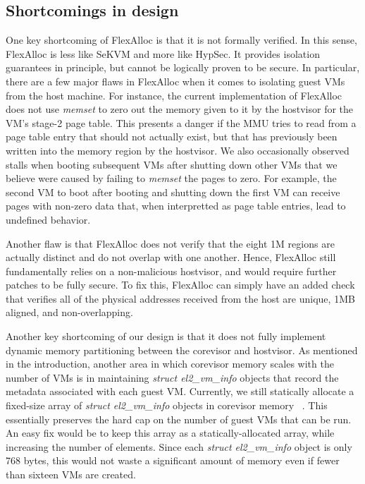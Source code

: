 \subsection{Shortcomings in design}

One key shortcoming of FlexAlloc is that it is not formally verified. In
this sense, FlexAlloc is less like SeKVM and more like HypSec. It provides isolation guarantees
in principle, but cannot be logically proven to be secure. In particular, there
are a few major flaws in FlexAlloc when it comes to isolating guest VMs from
the host machine. For instance, the current implementation of FlexAlloc
does not use \textit{memset} to zero out the memory given to it by the hostvisor
for the VM's stage-2 page table. This presents a danger if the MMU tries to
read from a page table entry that should not actually exist, but that has
previously been written into the memory region by the hostvisor. We also occasionally
observed stalls when booting subsequent VMs after shutting down other VMs that we
believe were caused by failing to \textit{memset} the pages to zero. For example, the second
VM to boot after booting and shutting down the first VM can receive pages with non-zero data
that, when interpretted as page table entries, lead to undefined behavior.

Another flaw is that
FlexAlloc does not verify that the eight 1M regions are actually distinct and
do not overlap with one another. Hence, FlexAlloc still fundamentally relies on
a non-malicious hostvisor, and would require further patches to be fully secure.
To fix this, FlexAlloc can simply have an added check that verifies all of the
physical addresses received from the host are unique, 1MB aligned, and non-overlapping.

Another key shortcoming of our design is that it does not fully implement
dynamic memory partitioning between the corevisor and hostvisor. As mentioned in
the introduction, another area in which corevisor memory scales with the number
of VMs is in maintaining \textit{struct el2\_vm\_info} objects that record the
metadata associated with each guest VM. Currently, we still statically allocate
a fixed-size array of \textit{struct el2\_vm\_info} objects in corevisor
memory ~\cite{hypsec_host.h}. This essentially preserves the hard cap on the
number of guest VMs that can be run. An easy fix would be to keep this array
as a statically-allocated array, while increasing the number of elements. Since each
\textit{struct el2\_vm\_info} object is only 768 bytes, this would not waste a
significant amount of memory even if fewer than sixteen VMs are created.

